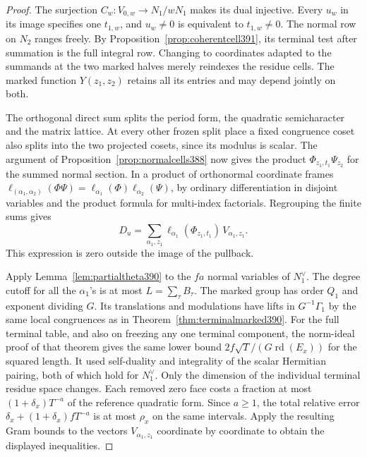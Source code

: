 \documentclass[a4paper,11pt]{article}
\theoremstyle{definition}
\theoremstyle{remark}
\numberwithin{equation}{section}
\begin{document}
\begin{proof}
The surjection \(C_w:V_{0,w}\to N_1/wN_1\) makes
its dual injective. Every \(u_w\) in its image specifies
one \(t_{1,w}\), and \(u_w\ne0\) is equivalent to
\(t_{1,w}\ne0\). The normal row on \(N_2\) ranges freely.
By Proposition~\ref{prop:coherentcell391}, its terminal test
after summation is the full integral row. Changing to coordinates
adapted to the summands at the two marked halves merely
reindexes the residue cells. The marked function \(Y(z_1,z_2)\)
retains all its entries and may depend jointly on both.

The orthogonal direct sum splits the period form, the quadratic
semicharacter and the matrix lattice. At every other frozen
split place a fixed congruence coset also splits into the two
projected cosets, since its modulus is scalar. The argument
of Proposition~\ref{prop:normalcells388} now gives the product
\(\Phi_{z_1,t_1}\Psi_{z_2}\) for the summed normal section.
In a product of orthonormal coordinate frames
\(\ell_{(\alpha_1,\alpha_2)}(\Phi\Psi)=
\ell_{\alpha_1}(\Phi)\ell_{\alpha_2}(\Psi)\), by ordinary
differentiation in disjoint variables and the product formula
for multi-index factorials. Regrouping the finite sums gives
\[
       D_u=\sum_{\alpha_1,z_1}
                 \ell_{\alpha_1}(\Phi_{z_1,t_1})\, V_{\alpha_1,z_1}.
\]
This expression is zero outside the image of the pullback.

Apply Lemma~\ref{lem:partialtheta390} to the \(fa\) normal
variables of \(N_1^\vee\). The degree cutoff for all the
\(\alpha_1\)'s is at most \(L=\sum_\tau B_\tau\). The marked
group has order \(Q_1\) and exponent dividing \(G\). Its
translations and modulations have lifts in \(G^{-1}\Gamma_1\)
by the same local congruences as in
Theorem~\ref{thm:terminalmarked390}. For the full terminal
table, and also on freezing any one terminal component, the
norm-ideal proof of that theorem gives the same lower bound
\(2f\sqrt T/(G\operatorname{rd}(E_x))\) for the squared
length. It used self-duality and integrality of the scalar
Hermitian pairing, both of which hold for \(N_1^\vee\).
Only the dimension of the individual terminal residue space
changes. Each removed zero face costs a fraction at most
\((1+\delta_x)T^{-a}\) of the reference quadratic form.
Since \(a\ge1\), the total relative error
\(\delta_x+(1+\delta_x)fT^{-a}\) is at most \(\rho_x\)
on the same intervals. Apply the resulting Gram bounds to
the vectors \(V_{\alpha_1,z_1}\) coordinate by coordinate
to obtain the displayed inequalities.


\end{proof}
\end{document}
